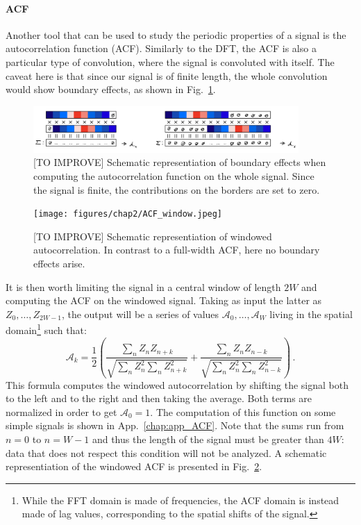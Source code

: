 \paragraph{ACF}
Another tool that can be used to study the periodic properties of a signal is the autocorrelation function (ACF). Similarly to the DFT, the ACF is also a particular type of convolution, where the signal is convoluted with itself. The caveat here is that since our signal is of finite length, the whole convolution would show boundary effects, as shown in Fig.\ \ref{fig:ACF_bound}.
\begin{figure}[h!]
    \centering
    \includegraphics[width=0.9\textwidth]{figures/chap2/ACF_bound.jpeg}
    \caption{[TO IMPROVE] Schematic representiation of boundary effects when computing the autocorrelation function on the whole signal. Since the signal is finite, the contributions on the borders are set to zero.}
    \label{fig:ACF_bound}
\end{figure}
\begin{figure}[h!]
    \centering
    \texttt{[image: figures/chap2/ACF\_window.jpeg]}
    \caption{[TO IMPROVE] Schematic representiation of windowed autocorrelation. In contrast to a full-width ACF, here no boundary effects arise.}
    \label{fig:ACF_window}
\end{figure}
It is then worth limiting the signal in a central window of length $2W$ and computing the ACF on the windowed signal. Taking as input the latter as $Z_0,\dots,Z_{2W-1}$, the output will be a series of values $\mathcal{A}_0,\dots,\mathcal{A}_{W}$ living in the spatial domain\footnote{While the FFT domain is made of frequencies, the ACF domain is instead made of lag values, corresponding to the spatial shifts of the signal.} such that:
\begin{equation*}
    \mathcal{A}_k = \frac{1}{2} \left( \frac{\sum_{n} Z_n Z_{n+k}}{\sqrt{\sum_{n} Z_n^2 \sum_{n} Z_{n+k}^2}} + \frac{\sum_{n} Z_n Z_{n-k}}{\sqrt{\sum_{n} Z_n^2 \sum_{n} Z_{n-k}^2}} \right)\, .
\end{equation*}
This formula computes the windowed autocorrelation by shifting the signal both to the left and to the right and then taking the average.
Both terms are normalized in order to get $\mathcal{A}_0 = 1$. The computation of this function on some simple signals is shown in App.\ \ref{chap:app_ACF}. Note that the sums run from $n = 0$ to $n = W-1$ and thus the length of the signal must be greater than $4W$: data that does not respect this condition will not be analyzed. A schematic representiation of the windowed ACF is presented in Fig.\ \ref{fig:ACF_window}.

